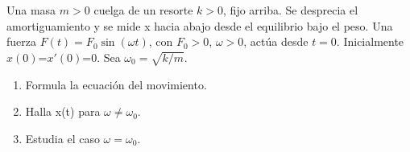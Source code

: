 Una masa \(m>0\) cuelga de un resorte \(k>0\), fijo arriba. Se desprecia el amortiguamiento y se mide x hacia abajo desde el equilibrio bajo el peso. Una fuerza \(F(t)=F_0\sin(\omega t)\), con \(F_0>0\), \(\omega>0\), actúa desde \(t=0\). Inicialmente \(x(0)\)=\(x'(0)\)=0. Sea \(\omega_0=\sqrt{k/m}\).

\begin{enumerate}[label=(\alph*),ref=\alph*,leftmargin=*]
\item Formula la ecuación del movimiento.
\item Halla x(t) para \(\omega\ne\omega_0\).
\item Estudia el caso \(\omega=\omega_0\).
\end{enumerate}
